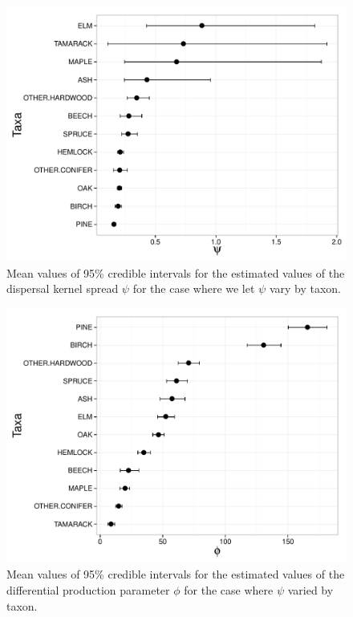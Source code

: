 \begin{figure}
\centering
\includegraphics[width=7in]{figures/psi_vary_psi.pdf}
\caption{Mean values of 95\% credible intervals for the estimated values of the dispersal kernel spread $\psi$ for the case where we let $\psi$ vary by taxon.}
\label{fig:psi_vary_psi}
\end{figure}

\begin{figure}
\centering
\includegraphics[width=7in]{figures/phi_vary_psi.pdf}
\caption{Mean values of 95\% credible intervals for the estimated values of the differential production parameter $\phi$ for the case where $\psi$ varied by taxon.}
\label{fig:phi_vary_psi}
\end{figure}


